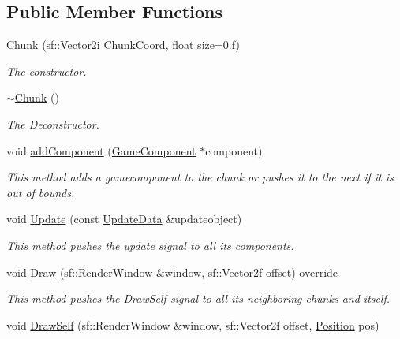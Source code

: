 \subsection*{Public Member Functions}
\begin{DoxyCompactItemize}
\item 
\hyperlink{class_chunk_ad46cf5f6f874fbeff528ef237251a9f2}{Chunk} (sf\-::\-Vector2i \hyperlink{class_chunk_abb5b1842148b3d7c616065766bfd2b33}{Chunk\-Coord}, float \hyperlink{class_chunk_af46410b580baf2985b01044d5c041b2e}{size}=0.f)
\begin{DoxyCompactList}\small\item\em The constructor. \end{DoxyCompactList}\item 
\hyperlink{class_chunk_ad21b515f41c9a1d21740b9e7e3f8eede}{$\sim$\-Chunk} ()
\begin{DoxyCompactList}\small\item\em The Deconstructor. \end{DoxyCompactList}\item 
void \hyperlink{class_chunk_aa5b5c5515c800f2171899caf704db5dc}{add\-Component} (\hyperlink{class_game_component}{Game\-Component} $\ast$component)
\begin{DoxyCompactList}\small\item\em This method adds a gamecomponent to the chunk or pushes it to the next if it is out of bounds. \end{DoxyCompactList}\item 
void \hyperlink{class_chunk_a98a8a36b0197668d37994f77b2952084}{Update} (const \hyperlink{class_update_data}{Update\-Data} \&updateobject)
\begin{DoxyCompactList}\small\item\em This method pushes the update signal to all its components. \end{DoxyCompactList}\item 
void \hyperlink{class_chunk_a3203da1471b5572e0dd2cd82e6dceb42}{Draw} (sf\-::\-Render\-Window \&window, sf\-::\-Vector2f offset) override
\begin{DoxyCompactList}\small\item\em This method pushes the Draw\-Self signal to all its neighboring chunks and itself. \end{DoxyCompactList}\item 
void \hyperlink{class_chunk_a238c9e4adf0dfc78d6b8c778aec66e69}{Draw\-Self} (sf\-::\-Render\-Window \&window, sf\-::\-Vector2f offset, \hyperlink{_chunk_8hpp_ab91b34ae619fcdfcba4522b4f335bf83}{Position} pos)

\end{DoxyCompactItemize}
